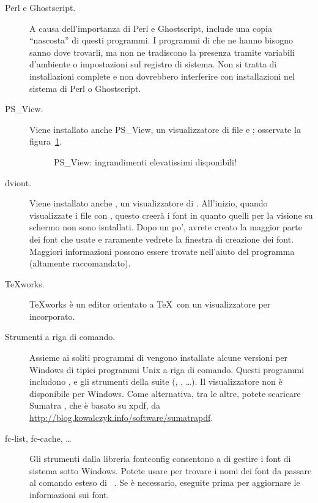 \documentclass{article}
\begin{document}
\begin{description}
\item[Perl e Ghostscript.] A causa dell'importanza di Perl e Ghostscript,
  \TL{} include una copia ``nascosta'' di questi programmi. I programmi di
  \TL{} che ne hanno bisogno sanno dove trovarli, ma non ne tradiscono la
  presenza tramite variabili d'ambiente o impostazioni sul registro di
  sistema. Non si tratta di installazioni complete e non dovrebbero
  interferire con installazioni nel sistema di Perl o Ghostscript.

\item[PS\_View.] Viene installato anche PS\_View, un visualizzatore di
  file \PS{} e ; osservate la figura~\ref{fig:psview}.

\begin{figure}[tb]
\caption{PS\_View: ingrandimenti elevatissimi disponibili!}
\label{fig:psview}
\end{figure}

\item[dviout.] Viene installato anche , un visualizzatore di
  . All'inizio, quando visualizzate i file con ,
  questo creerà i font in quanto quelli per la visione su schermo non sono
  isntallati. Dopo un po', avrete creato la maggior parte dei font che
  usate e raramente vedrete la finestra di creazione dei font. Maggiori
  informazioni possono essere trovate nell'aiuto del programma (altamente
  raccomandato).

\item[\TeX{}works.] \TeX{}works è un editor orientato a \TeX\ con un
  visualizzatore per  incorporato.

\item[Strumenti a riga di comando.] Assieme ai soliti programmi di \TL{}
  vengono installate alcune versioni per Windows di tipici programmi Unix
  a riga di comando. Questi programmi includono ,
   e gli strumenti della suite 
  (, , \ldots). Il visualizzatore
   non è disponibile per Windows. Come alternativa, tra le
  altre, potete scaricare Sumatra , che è basato su xpdf, da
  \url{http://blog.kowalczyk.info/software/sumatrapdf}.

\item[fc-list, fc-cache, \ldots] Gli strumenti dalla libreria fontconfig
  consentono a \XeTeX{} di gestire i font di sistema sotto Windows. Potete
  usare  per trovare i nomi dei font da passare al comando
  esteso di \XeTeX\ . Se è necessario, eseguite prima
   per aggiornare le informazioni sui font.

\end{description}
\end{document}
